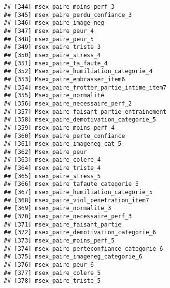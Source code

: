 \documentclass[
]{article}
\begin{document}
\begin{verbatim}
## [344] msex_paire_moins_perf_3                                          
## [345] msex_paire_perdu_confiance_3                                     
## [346] msex_paire_image_neg                                             
## [347] msex_paire_peur_4                                                
## [348] msex_paire_peur_5                                                
## [349] msex_paire_triste_3                                              
## [350] msex_paire_stress_4                                              
## [351] msex_paire_ta_faute_4                                            
## [352] Msex_paire_humiliation_categorie_4                               
## [353] Msex_paire_embrasser_item6                                       
## [354] msex_paire_frotter_partie_intime_item7                           
## [355] Msex_paire_normalité                                             
## [356] msex_paire_necessaire_perf_2                                     
## [357] Msex_paire_faisant_partie_entrainement                           
## [358] msex_paire_demotivation_categorie_5                              
## [359] msex_paire_moins_perf_4                                          
## [360] Msex_paire_perte_confiance                                       
## [361] msex_paire_imageneg_cat_5                                        
## [362] Msex_paire_peur                                                  
## [363] msex_paire_colere_4                                              
## [364] msex_paire_triste_4                                              
## [365] msex_paire_stress_5                                              
## [366] msex_paire_tafaute_categorie_5                                   
## [367] msex_paire_humiliation_categorie_5                               
## [368] msex_paire_viol_penetration_item7                                
## [369] msex_paire_normalite_3                                           
## [370] msex_paire_necessaire_perf_3                                     
## [371] msex_paire_faisant_partie                                        
## [372] msex_paire_demotivation_categorie_6                              
## [373] msex_paire_moins_perf_5                                          
## [374] msex_paire_perteconfiance_categorie_6                            
## [375] msex_paire_imageneg_categorie_6                                  
## [376] msex_paire_peur_6                                                
## [377] msex_paire_colere_5                                              
## [378] msex_paire_triste_5                                              

\end{verbatim}
\end{document}

